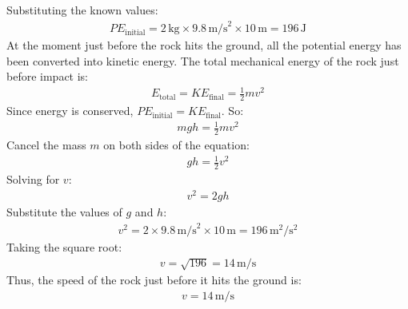 \documentclass[letterpaper,10pt,english]{jupyterBook}
\begin{document}
\sphinxAtStartPar
Substituting the known values:
\begin{equation*}
\begin{split}
PE_\text{initial} = 2 \, \text{kg} \times 9.8 \, \text{m/s}^2 \times 10 \, \text{m} = 196 \, \text{J}
\end{split}
\end{equation*}
\sphinxAtStartPar
At the moment just before the rock hits the ground, all the potential energy has been converted into kinetic energy. The total mechanical energy of the rock just before impact is:
\begin{equation*}
\begin{split}
E_\text{total} = KE_\text{final} = \frac{1}{2} m v^2
\end{split}
\end{equation*}
\sphinxAtStartPar
Since energy is conserved, \(PE_\text{initial} = KE_\text{final}\). So:
\begin{equation*}
\begin{split}
mgh = \frac{1}{2} m v^2
\end{split}
\end{equation*}
\sphinxAtStartPar
Cancel the mass \(m\) on both sides of the equation:
\begin{equation*}
\begin{split}
gh = \frac{1}{2} v^2
\end{split}
\end{equation*}
\sphinxAtStartPar
Solving for \(v\):
\begin{equation*}
\begin{split}
v^2 = 2gh
\end{split}
\end{equation*}
\sphinxAtStartPar
Substitute the values of \(g\) and \(h\):
\begin{equation*}
\begin{split}
v^2 = 2 \times 9.8 \, \text{m/s}^2 \times 10 \, \text{m} = 196 \, \text{m}^2/\text{s}^2
\end{split}
\end{equation*}
\sphinxAtStartPar
Taking the square root:
\begin{equation*}
\begin{split}
v = \sqrt{196} = 14 \, \text{m/s}
\end{split}
\end{equation*}
\sphinxAtStartPar
Thus, the speed of the rock just before it hits the ground is:
\begin{equation*}
\begin{split}
v = 14 \, \text{m/s}
\end{split}
\end{equation*}
\end{document}
